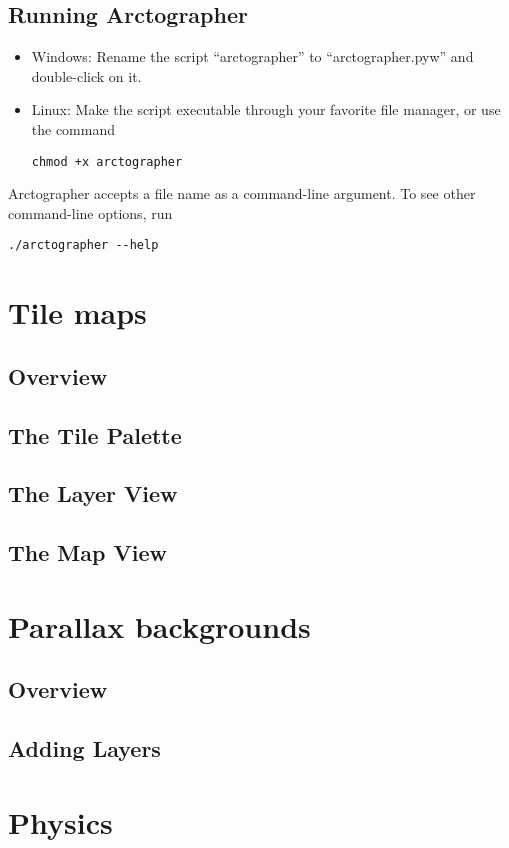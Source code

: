 \documentclass[12pt,letterpaper]{article}
\begin{document}
\subsection{Running Arctographer}
\begin{itemize}
	\item Windows: Rename the script ``arctographer'' to ``arctographer.pyw'' and
		double-click on it.
	\item Linux: Make the script executable through your favorite file manager,
		or use the command \begin{verbatim}chmod +x arctographer\end{verbatim}
\end{itemize}
Arctographer accepts a file name as a command-line argument. To see other
command-line options, run \begin{verbatim}./arctographer --help\end{verbatim}

\section{Tile maps}
\subsection{Overview}
\subsection{The Tile Palette}
\subsection{The Layer View}
\subsection{The Map View}

\section{Parallax backgrounds}
\subsection{Overview}
\subsection{Adding Layers}

\section{Physics}
\end{document}
